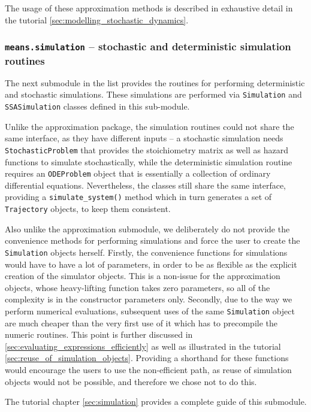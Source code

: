 The usage of these approximation methods is described in exhaustive detail in the tutorial \autoref{sec:modelling_stochastic_dynamics}.

\subsubsection{{\tt means.simulation} -- stochastic and deterministic simulation routines}

The next submodule in the list provides the routines for performing deterministic and stochastic simulations.
These simulations are performed via \verb"Simulation" and \verb"SSASimulation" classes defined in this sub-module.

Unlike the approximation package, the simulation routines could not share the same interface, as they have different inputs -- a stochastic simulation needs \verb"StochasticProblem" that provides the stoichiometry matrix as well as hazard functions to simulate stochastically, while the deterministic simulation routine requires an \verb"ODEProblem" object that is essentially a collection of ordinary differential equations.
Nevertheless, the classes still share the same interface, providing a \verb"simulate_system()" method which in turn generates a set of \verb"Trajectory" objects, to keep them consistent.

Also unlike the approximation submodule, we deliberately do not provide the convenience methods for performing simulations and force the user to create the \verb"Simulation" objects herself. 
Firstly, the convenience functions for simulations would have to have a lot of parameters, in order to be as flexible as the explicit creation of the simulator objects. 
This is a non-issue for the approximation objects, whose heavy-lifting function takes zero parameters, so all of the complexity is in the constructor parameters only.
Secondly, due to the way we perform numerical evaluations, subsequent uses of the same \verb"Simulation" object are much cheaper than the very first use of it which has to precompile the numeric routines.
This point is further discussed in \autoref{sec:evaluating_expressions_efficiently} as well as illustrated in the tutorial \autoref{sec:reuse_of_simulation_objects}. 
Providing a shorthand for these functions would encourage the users to use the non-efficient path, as reuse of simulation objects would not be possible, and therefore we chose not to do this.

The tutorial chapter \autoref{sec:simulation} provides a complete guide of this submodule.

